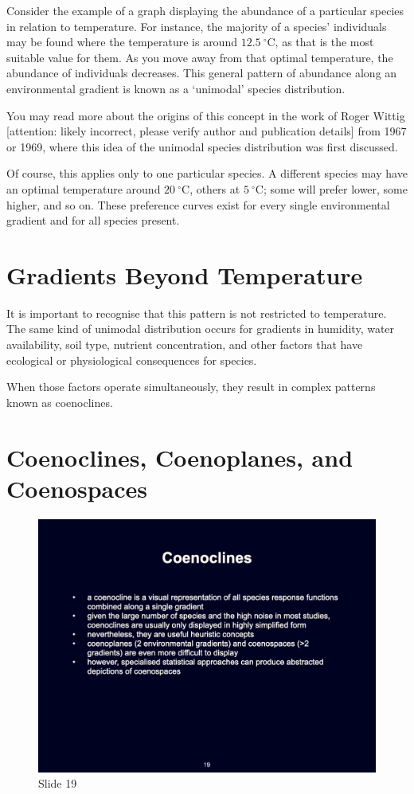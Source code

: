 \documentclass[
  12pt,
]{book}
\begin{document}
Consider the example of a graph displaying the abundance of a particular
species in relation to temperature. For instance, the majority of a
species' individuals may be found where the temperature is around
\(12.5~^\circ\text{C}\), as that is the most suitable value for them. As
you move away from that optimal temperature, the abundance of
individuals decreases. This general pattern of abundance along an
environmental gradient is known as a `unimodal' species distribution.

You may read more about the origins of this concept in the work of Roger
Wittig {[}attention: likely incorrect, please verify author and
publication details{]} from 1967 or 1969, where this idea of the
unimodal species distribution was first discussed.

Of course, this applies only to one particular species. A different
species may have an optimal temperature around \(20~^\circ\text{C}\),
others at \(5~^\circ\text{C}\); some will prefer lower, some higher, and
so on. These preference curves exist for every single environmental
gradient and for all species present.

\section{Gradients Beyond
Temperature}\label{gradients-beyond-temperature}

It is important to recognise that this pattern is not restricted to
temperature. The same kind of unimodal distribution occurs for gradients
in humidity, water availability, soil type, nutrient concentration, and
other factors that have ecological or physiological consequences for
species.

When those factors operate simultaneously, they result in complex
patterns known as coenoclines.

\section{Coenoclines, Coenoplanes, and
Coenospaces}\label{coenoclines-coenoplanes-and-coenospaces}

\begin{figure}[ht]
\centering
\includegraphics[width=0.8\linewidth]{../images/BDC334/BDC334-019.jpeg}
\caption*{Slide 19}
\end{figure}
\end{document}
